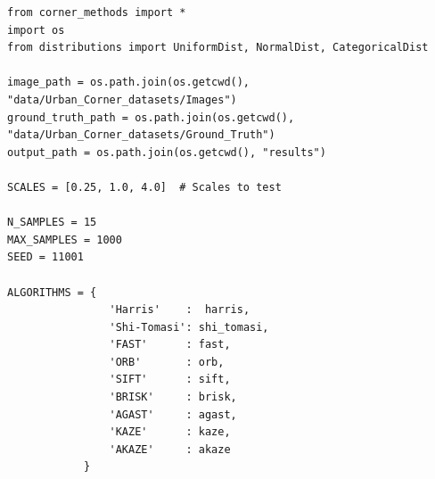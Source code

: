 \documentclass[journal]{IEEEtran}
\begin{document}
\begin{lstlisting}[style=python, caption={Setup Parameters}, label={lst:params}]
from corner_methods import *
import os
from distributions import UniformDist, NormalDist, CategoricalDist

image_path = os.path.join(os.getcwd(), "data/Urban_Corner_datasets/Images")
ground_truth_path = os.path.join(os.getcwd(), "data/Urban_Corner_datasets/Ground_Truth")
output_path = os.path.join(os.getcwd(), "results")

SCALES = [0.25, 1.0, 4.0]  # Scales to test

N_SAMPLES = 15
MAX_SAMPLES = 1000
SEED = 11001

ALGORITHMS = {
                'Harris'    :  harris,
                'Shi-Tomasi': shi_tomasi,
                'FAST'      : fast,
                'ORB'       : orb,
                'SIFT'      : sift,
                'BRISK'     : brisk,
                'AGAST'     : agast,
                'KAZE'      : kaze,
                'AKAZE'     : akaze
            }


\end{lstlisting}
\end{document}
